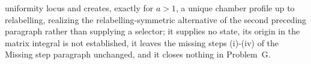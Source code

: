 \documentclass{article}
\begin{document}
uniformity locus and creates, exactly for \(a>1\), a unique chamber profile up to relabelling, realizing the relabelling-symmetric alternative of the second preceding paragraph rather than supplying a selector; it supplies no state, its origin in the matrix integral is not established, it leaves the missing steps (i)-(iv) of the Missing step paragraph unchanged, and it closes nothing in Problem~G.
\end{document}
